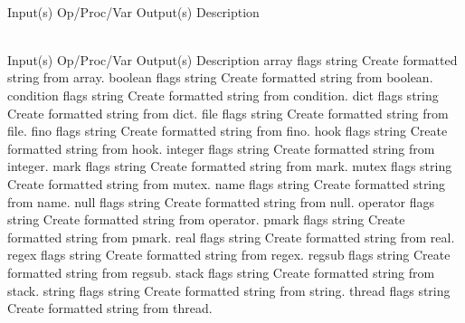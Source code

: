 \begin{longtable}{}
\caption{outputsdict summary}
\\
\hline
\optableent
	{Input(s)}
	{Op/Proc/Var}
	{Output(s)}
	{Description}
\hline \hline
\endfirsthead
\caption[]{\emph{continued}} \\
\hline
\optableent
	{Input(s)}
	{Op/Proc/Var}
	{Output(s)}
	{Description}
\hline \hline \endhead
{} \endfoot
\hline \endlastfoot
\optableent
	{array flags}
	{{\bf {}}}
	{string}
	{Create formatted string from array.}
\hline
\optableent
	{boolean flags}
	{{\bf {}}}
	{string}
	{Create formatted string from boolean.}
\hline
\optableent
	{condition flags}
	{{\bf {}}}
	{string}
	{Create formatted string from condition.}
\hline
\optableent
	{dict flags}
	{{\bf {}}}
	{string}
	{Create formatted string from dict.}
\hline
\optableent
	{file flags}
	{{\bf {}}}
	{string}
	{Create formatted string from file.}
\hline
\optableent
	{fino flags}
	{{\bf {}}}
	{string}
	{Create formatted string from fino.}
\hline
\optableent
	{hook flags}
	{{\bf {}}}
	{string}
	{Create formatted string from hook.}
\hline
\optableent
	{integer flags}
	{{\bf {}}}
	{string}
	{Create formatted string from integer.}
\hline
\optableent
	{mark flags}
	{{\bf {}}}
	{string}
	{Create formatted string from mark.}
\hline
\optableent
	{mutex flags}
	{{\bf {}}}
	{string}
	{Create formatted string from mutex.}
\hline
\optableent
	{name flags}
	{{\bf {}}}
	{string}
	{Create formatted string from name.}
\hline
\optableent
	{null flags}
	{{\bf {}}}
	{string}
	{Create formatted string from null.}
\hline
\optableent
	{operator flags}
	{{\bf {}}}
	{string}
	{Create formatted string from operator.}
\hline
\optableent
	{pmark flags}
	{{\bf {}}}
	{string}
	{Create formatted string from pmark.}
\hline
\optableent
	{real flags}
	{{\bf {}}}
	{string}
	{Create formatted string from real.}
\hline
\optableent
	{regex flags}
	{{\bf {}}}
	{string}
	{Create formatted string from regex.}
\hline
\optableent
	{regsub flags}
	{{\bf {}}}
	{string}
	{Create formatted string from regsub.}
\hline
\optableent
	{stack flags}
	{{\bf {}}}
	{string}
	{Create formatted string from stack.}
\hline
\optableent
	{string flags}
	{{\bf {}}}
	{string}
	{Create formatted string from string.}
\hline
\optableent
	{thread flags}
	{{\bf {}}}
	{string}
	{Create formatted string from thread.}
\end{longtable}

